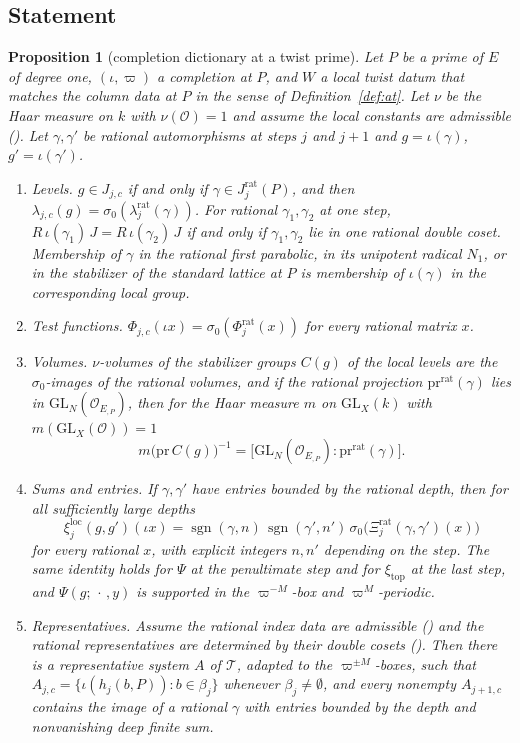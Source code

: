 \documentclass[11pt]{article}
\newcommand{\OEr}{\mathcal O_E}
\newcommand{\Ok}{\mathcal O}
\newcommand{\GL}{\mathrm{GL}}
\newcommand{\sgn}{\operatorname{sgn}}
\newtheorem{proposition}[theorem]{Proposition}
\theoremstyle{definition}
\theoremstyle{remark}
\begin{document}
\subsection{Statement}

\begin{proposition}[completion dictionary at a twist prime]\label{prop:C}
Let $P$ be a prime of $E$ of degree one, $(\iota,\varpi)$ a completion at $P$, and $W$ a local twist datum that matches the column data at $P$ in the sense of Definition~\ref{def:at}. Let $\nu$ be the Haar measure on $k$ with $\nu(\Ok)=1$ and assume the local constants are admissible (). Let $\gamma,\gamma'$ be rational automorphisms at steps $j$ and $j+1$ and $g=\iota(\gamma)$, $g'=\iota(\gamma')$.
\begin{enumerate}[label=(\roman*),itemsep=2pt]
\item \emph{Levels.} $g\in J_{j,c}$ if and only if $\gamma\in J^{\mathrm{rat}}_j(P)$, and then $\lambda_{j,c}(g)=\sigma_0(\lambda^{\mathrm{rat}}_j(\gamma))$. For rational $\gamma_1,\gamma_2$ at one step, $R\,\iota(\gamma_1)\,J=R\,\iota(\gamma_2)\,J$ if and only if $\gamma_1,\gamma_2$ lie in one rational double coset. Membership of $\gamma$ in the rational first parabolic, in its unipotent radical $N_1$, or in the stabilizer of the standard lattice at $P$ is membership of $\iota(\gamma)$ in the corresponding local group.
\item \emph{Test functions.} $\Phi_{j,c}(\iota x)=\sigma_0(\Phi^{\mathrm{rat}}_j(x))$ for every rational matrix $x$.
\item \emph{Volumes.} $\nu$-volumes of the stabilizer groups $C(g)$ of the local levels are the $\sigma_0$-images of the rational volumes, and if the rational projection $\mathrm{pr}^{\mathrm{rat}}(\gamma)$ lies in $\GL_{N}(\OEr_{,P})$, then for the Haar measure $m$ on $\GL_{X}(k)$ with $m(\GL_X(\Ok))=1$
\[
m\big(\mathrm{pr}\,C(g)\big)^{-1}=\big[\GL_N(\OEr_{,P}):\mathrm{pr}^{\mathrm{rat}}(\gamma)\big].
\]
\item \emph{Sums and entries.} If $\gamma,\gamma'$ have entries bounded by the rational depth, then for all sufficiently large depths
\[
\xi^{\mathrm{loc}}_j(g,g')(\iota x)=\sgn(\gamma,n)\,\sgn(\gamma',n')\,\sigma_0\big(\Xi^{\mathrm{rat}}_j(\gamma,\gamma')(x)\big)
\]
for every rational $x$, with explicit integers $n,n'$ depending on the step. The same identity holds for $\Psi$ at the penultimate step and for $\xi_{\mathrm{top}}$ at the last step, and $\Psi(g;\,\cdot\,,y)$ is supported in the $\varpi^{-M}$-box and $\varpi^{M}$-periodic.
\item \emph{Representatives.} Assume the rational index data are admissible () and the rational representatives are determined by their double cosets (). Then there is a representative system $A$ of $\mathcal T$, adapted to the $\varpi^{\pm M}$-boxes, such that $A_{j,c}=\{\iota(h_j(b,P)) : b\in\beta_j\}$ whenever $\beta_j\ne\emptyset$, and every nonempty $A_{j+1,c}$ contains the image of a rational $\gamma$ with entries bounded by the depth and nonvanishing deep finite sum.
\end{enumerate}
\end{proposition}
\end{document}
